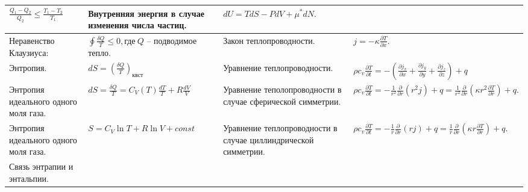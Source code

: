 \documentclass{article}
\begin{document}
\begin{tabular}{ |p{4.5cm}|p{5cm}|p{4.5cm}|p{5cm}|  }
$\frac{Q_1 - Q_2}{Q_2} \leq \frac{T_1 - T_2}{T_1}$                           &  %
Внутренняя энергия в случае изменения числа частиц.                          &  %
$dU = TdS - PdV + \mu^* dN.$                                                 \\ %
\hline
Неравенство Клаузиуса:                                                       &  %
$\oint \frac{\delta{Q}}{T} \leq 0, \text{где} \: Q$ -- подводимое тепло.     &  %
Закон теплопроводности.                                                      &  %
$j = - \kappa \frac{\partial T}{\partial x}.$                                    \\ %
\hline
Энтропия.                                                                    &  %
$dS  = \left( \frac{\delta Q}{T} \right)_\text{квст}$                        &  %
Уравнение теплопроводности.                                                  &  %
$
\rho c_v \frac{\partial T}{\partial t} = -
\left( 
  \frac{\partial j_x}{\partial x} + 
  \frac{\partial j_y}{\partial y} +
  \frac{\partial j_z}{\partial z}
\right) +
q
$                                                                            \\ %
\hline
Энтропия идеального одного моля газа.                                        &  %
$dS = \frac{\delta Q}{T} = C_V(T) \frac{dT}{T} + R \frac{dV}{V}$             &  %
Уравнение теполопроводности в случае сферической симметрии.                  &  %
$ 
\rho c_v \frac{\partial T}{\partial t} = -
\frac{1}{r^2} \frac{\partial}{\partial r} (r^2 j) + q = 
\frac{1}{r^2} \frac{\partial}{\partial r} 
\left( \kappa r^2 \frac{\partial T}{\partial r}  \right) + q.
$                                                                            \\ %
\hline
Энтропия идеального одного моля газа.                                        &  %
$S = C_V \ln T + R \ln V + const$                                            &  %
Уравнение теплопроводности в случае циллиндрической симметрии.               &  %
$
\rho c_v \frac{\partial T}{\partial t} = -
\frac{1}{r} \frac{\partial}{\partial r} (r j) + q = 
\frac{1}{r} \frac{\partial}{\partial r} 
\left( \kappa r \frac{\partial T}{\partial r}  \right) + q.
$                                                                            \\ %
\hline
Связь энтрапии и энтальпии.                                                  &  %

\end{tabular}
\end{document}

